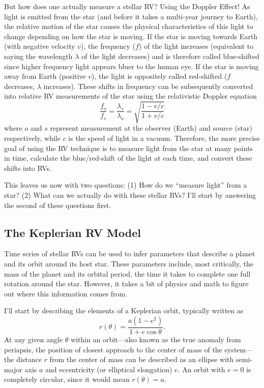 But how does one actually measure a stellar RV? Using the Doppler Effect! As light is emitted from the star (and before it takes a multi-year journey to Earth), the relative motion of the star causes the physical characteristics of this light to change depending on how the star is moving. If the star is moving towards Earth (with negative velocity $v$), the frequency ($f$) of the light increases (equivalent to saying the wavelength $\lambda$ of the light decreases) and is therefore called blue-shifted since higher frequency light appears bluer to the human eye. If the star is moving away from Earth (positive $v$), the light is oppositely called red-shifted ($f$ decreases, $\lambda$ increases). These shifts in frequency can be subsequently converted into relative RV measurements of the star using the relativistic Doppler equation
\begin{equation}
    \frac{f_o}{f_s} = \frac{\lambda_s}{\lambda_o} = \sqrt{\frac{1 - v/c}{1 + v/c}}
    \label{eq:relative-doppler-effect}
\end{equation}
where $o$ and $s$ represent measurement at the observer (Earth) and source (star) respectively, while $c$ is the speed of light in a vacuum. Therefore, the more precise goal of using the RV technique is to measure light from the star at many points in time, calculate the blue/red-shift of the light at each time, and convert these shifts into RVs.

This leaves us now with two questions: (1) How do we ``measure light'' from a star? (2) What can we actually do with these stellar RVs? I'll start by answering the second of these questions first.

\subsection{The Keplerian RV Model}

Time series of stellar RVs can be used to infer parameters that describe a planet and its orbit around its host star. These parameters include, most critically, the mass of the planet and its orbital period, the time it takes to complete one full rotation around the star. However, it takes a bit of physics and math to figure out where this information comes from.

I'll start by describing the elements of a Keplerian orbit, typically written as
\begin{equation}
    r(\theta) = \frac{a (1-e^2)}{1 + e \cos{\theta}}.
    \label{eq:kepler}
\end{equation}
At any given angle $\theta$ within an orbit---also known as the true anomaly from periapsis, the position of closest approach to the center of mass of the system---the distance $r$ from the center of mass can be described as an ellipse with semi-major axis $a$ and eccentricity (or elliptical elongation) $e$. An orbit with $e=0$ is completely circular, since it would mean $r(\theta)=a$.

